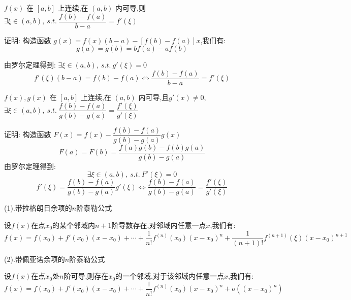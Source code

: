 \begin{theorem}[拉格朗日中值定理]

	$f(x)$ 在 $[a,b]$ 上连续,在 $(a,b)$ 内可导,则 $\exists \xi\in(a,b),\ s.t.\ \dfrac{f(b)-f(a)}{b-a}=f'(\xi)$

	证明: 构造函数 $g(x)=f(x)(b-a)-[f(b)-f(a)]x$,我们有:
	$$g(a)=g(b)=bf(a)-af(b)$$

	由罗尔定理得到:
	$\exists \xi\in(a,b),\ s.t.\ g'(\xi)=0$
	$$ f'(\xi)(b-a)=f(b)-f(a)\Leftrightarrow  \frac{f(b)-f(a)}{b-a}=f'(\xi)$$
\end{theorem}
\begin{theorem}[柯西中值定理]

	$f(x),g(x)$ 在 $[a,b]$ 上连续,在 $(a,b)$ 内可导,且$g'(x)\neq 0$,$\exists \xi\in(a,b),\ s.t.\ \dfrac{f(b)-f(a)}{g(b)-g(a)}=\dfrac{f'(\xi)}{g'(\xi)}$

	证明: 构造函数 $F(x)=f(x)-\dfrac{f(b)-f(a)}{g(b)-g(a)}g(x)$
	$$F(a)=F(b)=\frac{f(a)g(b)-f(b)g(a)}{g(b)-g(a)}$$
	由罗尔定理得到: $$\exists \xi\in(a,b),\ s.t.\ F'(\xi)=0$$
	$$ f'(\xi)=\frac{f(b)-f(a)}{g(b)-g(a)}g'(\xi)\Leftrightarrow  \frac{f(b)-f(a)}{g(b)-g(a)}=\frac{f'(\xi)}{g'(\xi)}$$
\end{theorem}
\begin{theorem}[泰勒公式]

	(1).带拉格朗日余项的$n$阶泰勒公式

	设$f(x)$在点$x_{0}$的某个邻域内$n+1$阶导数存在,对邻域内任意一点$x$,我们有:
	$$f(x)=f(x_{0})+f'(x_{0})(x-x_{0})+\cdots+\frac{1}{n!}f^{(n)}(x_{0})(x-x_{0})^{n}+\frac{1}{(n+1)!}f^{(n+1)}(\xi)(x-x_{0})^{n+1}$$

	(2).带佩亚诺余项的$n$阶泰勒公式

	设$f(x)$在点$x_{0}$处$n$阶可导,则存在$x_{0}$的一个邻域,对于该邻域内任意一点$x$,我们有:
	$$f(x)=f(x_{0})+f'(x_{0})(x-x_{0})+\cdots+\frac{1}{n!}f^{(n)}(x_{0})(x-x_{0})^{n}+o((x-x_{0})^n)$$
\end{theorem}
